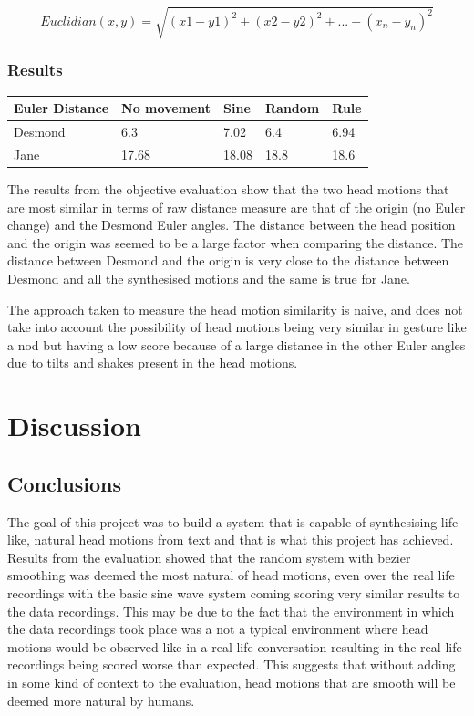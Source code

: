 \documentclass[bsc,frontabs,twoside,singlespacing,parskip,deptreport]{infthesis}
\begin{document}
\begin{equation}
Euclidian(x,y) = \sqrt{(x1 - y1)^2 + (x2 - y2)^2 + ... + (x_n - y_n)^2}
\end{equation}

\subsection{Results}

\begin{table}[h]
\begin{tabular}{lllll}
\hline
Euler Distance & No movement & Sine  & Random & Rule   \\ \hline
Desmond        & 6.3    & 7.02  & 6.4    & 6.94   \\
Jane           & 17.68  & 18.08 & 18.8   & 18.6 \\ \hline
\end{tabular}
\end{table}

The results from the objective evaluation show that the two head motions that are most similar in terms of raw distance measure are that of the origin (no Euler change) and the Desmond Euler angles. The distance between the head position and the origin was seemed to be a large factor when comparing the distance. The distance between Desmond and the origin is very close to the distance between Desmond and all the synthesised motions and the same is true for Jane. 

The approach taken to measure the head motion similarity is naive, and does not take into account the possibility of head motions being very similar in gesture like a nod but having a low score because of a large distance in the other Euler angles due to tilts and shakes present in the head motions.



\chapter{Discussion}

\section{Conclusions}

The goal of this project was to build a system that is capable of synthesising life-like, natural head motions from text and that is what this project has achieved. Results from the evaluation showed that the random system with bezier smoothing was deemed the most natural of head motions, even over the real life recordings with the basic sine wave system coming scoring very similar results to the data recordings. This may be due to the fact that the environment in which the data recordings took place was a not a typical environment where head motions would be observed like in a real life conversation resulting in the real life recordings being scored worse than expected. This suggests that without adding in some kind of context to the evaluation, head motions that are smooth will be deemed more natural by humans. 
\end{document}
